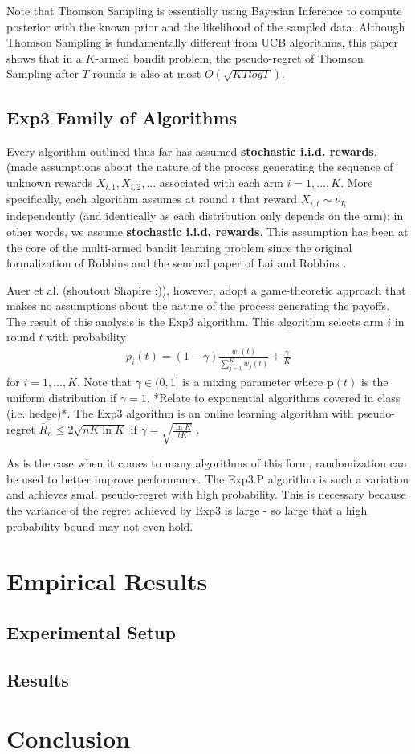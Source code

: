 \documentclass[12pt]{article}
\begin{document}
 Note that Thomson Sampling is essentially using Bayesian Inference to compute posterior with the known prior and the likelihood of the sampled data. Although Thomson Sampling is fundamentally different from UCB algorithms, this paper\cite{ThomsonSamplingRegret} shows that in a $K$-armed bandit problem, the pseudo-regret of Thomson Sampling after $T$ rounds is also at most $O(\sqrt{KTlogT})$.

\subsection{Exp3 Family of Algorithms}

Every algorithm outlined thus far has assumed \textbf{stochastic i.i.d. rewards}. (made assumptions about the nature of the process generating the sequence of unknown rewards $X_{i,1},X_{i,2},...$ associated with each arm $i=1,...,K$. More specifically, each algorithm assumes at round $t$ that reward $X_{i,t}\sim\nu_{I_{t}}$ independently (and identically as each distribution only depends on the arm); in other words, we assume \textbf{stochastic i.i.d. rewards}. This assumption has been at the core of the multi-armed bandit learning problem since the original formalization of Robbins \cite{robbins} and the seminal paper of Lai and Robbins \cite{lai}.

Auer et al. \cite{ThomsonTutorial} (shoutout Shapire :)), however, adopt a game-theoretic approach that makes no assumptions about the nature of the process generating the payoffs. The result of this analysis is the Exp3 algorithm. This algorithm selects arm $i$ in round $t$ with probability
\begin{align*}
p_{i}(t)=(1-\gamma)\frac{w_{i}(t)}{\sum_{j=1}^{K}w_{j}(t)}+\frac{\gamma}{K}
\end{align*}
for $i=1,...,K$. Note that $\gamma\in(0,1]$ is a mixing parameter where $\boldsymbol{p}(t)$ is the uniform distribution if $\gamma=1$. *Relate to exponential algorithms covered in class (i.e. hedge)*. The Exp3 algorithm is an online learning algorithm with pseudo-regret $\bar{R}_{n}\leq2\sqrt{nK\ln K}$ if $\gamma=\sqrt{\frac{\ln K}{tK}}$ \cite{bubeck}. 

As is the case when it comes to many algorithms of this form, randomization can be used to better improve performance. The Exp3.P algorithm is such a variation and achieves small pseudo-regret with high probability. This is necessary because the variance of the regret achieved by Exp3 is large - so large that a high probability bound may not even hold. 

\section{Empirical Results}

\subsection{Experimental Setup}

\subsection{Results}

\section{Conclusion}

\newpage
\printbibliography
\end{document}
